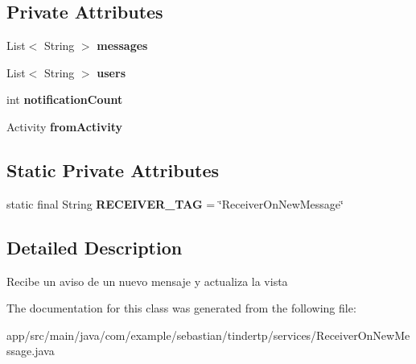 \subsection*{Private Attributes}
\begin{DoxyCompactItemize}
\item 
List$<$ String $>$ {\bfseries messages}\hypertarget{classcom_1_1example_1_1sebastian_1_1tindertp_1_1services_1_1ReceiverOnNewMessage_aefb1f1979008ab68b95221dd4827a4c2}{}\label{classcom_1_1example_1_1sebastian_1_1tindertp_1_1services_1_1ReceiverOnNewMessage_aefb1f1979008ab68b95221dd4827a4c2}

\item 
List$<$ String $>$ {\bfseries users}\hypertarget{classcom_1_1example_1_1sebastian_1_1tindertp_1_1services_1_1ReceiverOnNewMessage_a721b8d37c0ba21b3fb935c0348c234e4}{}\label{classcom_1_1example_1_1sebastian_1_1tindertp_1_1services_1_1ReceiverOnNewMessage_a721b8d37c0ba21b3fb935c0348c234e4}

\item 
int {\bfseries notification\+Count}\hypertarget{classcom_1_1example_1_1sebastian_1_1tindertp_1_1services_1_1ReceiverOnNewMessage_aac0f25c20f050064f00d9574ee341759}{}\label{classcom_1_1example_1_1sebastian_1_1tindertp_1_1services_1_1ReceiverOnNewMessage_aac0f25c20f050064f00d9574ee341759}

\item 
Activity {\bfseries from\+Activity}\hypertarget{classcom_1_1example_1_1sebastian_1_1tindertp_1_1services_1_1ReceiverOnNewMessage_a9779028d5e17bc3b3025dc3230edc079}{}\label{classcom_1_1example_1_1sebastian_1_1tindertp_1_1services_1_1ReceiverOnNewMessage_a9779028d5e17bc3b3025dc3230edc079}

\end{DoxyCompactItemize}
\subsection*{Static Private Attributes}
\begin{DoxyCompactItemize}
\item 
static final String {\bfseries R\+E\+C\+E\+I\+V\+E\+R\+\_\+\+T\+AG} = \char`\"{}Receiver\+On\+New\+Message\char`\"{}\hypertarget{classcom_1_1example_1_1sebastian_1_1tindertp_1_1services_1_1ReceiverOnNewMessage_a212055d7f5debc2e3d6c88ae9af74908}{}\label{classcom_1_1example_1_1sebastian_1_1tindertp_1_1services_1_1ReceiverOnNewMessage_a212055d7f5debc2e3d6c88ae9af74908}

\end{DoxyCompactItemize}


\subsection{Detailed Description}
Recibe un aviso de un nuevo mensaje y actualiza la vista 

The documentation for this class was generated from the following file\+:\begin{DoxyCompactItemize}
\item 
app/src/main/java/com/example/sebastian/tindertp/services/Receiver\+On\+New\+Message.\+java\end{DoxyCompactItemize}
